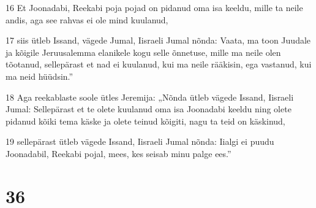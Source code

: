 \par 16 Et Joonadabi, Reekabi poja pojad on pidanud oma isa keeldu, mille ta neile andis, aga see rahvas ei ole mind kuulanud,
\par 17 siis ütleb Issand, vägede Jumal, Iisraeli Jumal nõnda: Vaata, ma toon Juudale ja kõigile Jeruusalemma elanikele kogu selle õnnetuse, mille ma neile olen tõotanud, sellepärast et nad ei kuulanud, kui ma neile rääkisin, ega vastanud, kui ma neid hüüdsin.”
\par 18 Aga reekablaste soole ütles Jeremija: „Nõnda ütleb vägede Issand, Iisraeli Jumal: Sellepärast et te olete kuulanud oma isa Joonadabi keeldu ning olete pidanud kõiki tema käske ja olete teinud kõigiti, nagu ta teid on käskinud,
\par 19 sellepärast ütleb vägede Issand, Iisraeli Jumal nõnda: Iialgi ei puudu Joonadabil, Reekabi pojal, mees, kes seisab minu palge ees.”

\chapter{36}

